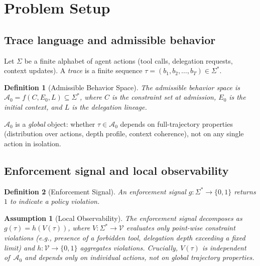 \documentclass[11pt]{article}
\newtheorem{definition}{Definition}[section]
\newtheorem{assumption}{Assumption}[section]
\newcommand{\Sigstar}{\Sigma^{*}}
\newcommand{\Azero}{\mathcal{A}_0}
\begin{document}
\section{Problem Setup}
\label{sec:setup}

\subsection{Trace language and admissible behavior}

Let $\Sigma$ be a finite alphabet of agent actions (tool calls, delegation
requests, context updates).  A \emph{trace} is a finite sequence
$\tau = (b_1, b_2, \ldots, b_T) \in \Sigstar$.

\begin{definition}[Admissible Behavior Space]
\label{def:A0}
The \emph{admissible behavior space} is $\Azero = f(C, E_0, L) \subseteq \Sigstar$,
where $C$ is the constraint set at admission, $E_0$ is the initial context, and
$L$ is the delegation lineage.
\end{definition}

$\Azero$ is a \emph{global} object: whether $\tau \in \Azero$ depends on
full-trajectory properties (distribution over actions, depth profile, context
coherence), not on any single action in isolation.

\subsection{Enforcement signal and local observability}

\begin{definition}[Enforcement Signal]
\label{def:enforcement}
An \emph{enforcement signal} $g : \Sigstar \to \{0,1\}$ returns $1$ to
indicate a policy violation.
\end{definition}

\begin{assumption}[Local Observability]
\label{asm:local}
The enforcement signal decomposes as $g(\tau) = h(V(\tau))$,
where $V : \Sigstar \to \mathcal{V}$ evaluates only
\emph{point-wise constraint violations}
(e.g., presence of a forbidden tool, delegation depth exceeding a fixed limit)
and $h : \mathcal{V} \to \{0,1\}$ aggregates violations.
Crucially, $V(\tau)$ is independent of~$\Azero$ and depends only on
individual actions, not on global trajectory properties.
\end{assumption}
\end{document}
